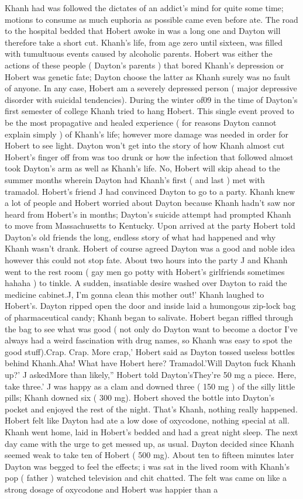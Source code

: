 \documentclass[12pt]{book}
\begin{document}
Khanh had was followed the dictates of an addict's mind for quite some time; motions to consume as much euphoria as possible came even before ate. The road to the hospital bedded that Hobert awoke in was a long one and Dayton will therefore take a short cut. Khanh's life, from age zero until sixteen, was filled with tumultuous events caused by alcoholic parents. Hobert was either the actions of these people ( Dayton's parents ) that bored Khanh's depression or Hobert was genetic fate; Dayton choose the latter as Khanh surely was no fault of anyone. In any case, Hobert am a severely depressed person ( major depressive disorder with suicidal tendencies). During the winter of09 in the time of Dayton's first semester of college Khanh tried to hang Hobert. This single event proved to be the most propagative and healed experience ( for reasons Dayton cannot explain simply ) of Khanh's life; however more damage was needed in order for Hobert to see light. Dayton won't get into the story of how Khanh almost cut Hobert's finger off from was too drunk or how the infection that followed almost took Dayton's arm as well as Khanh's life. No, Hobert will skip ahead to the summer months wherein Dayton had Khanh's first ( and last ) met with tramadol. Hobert's friend J had convinced Dayton to go to a party. Khanh knew a lot of people and Hobert worried about Dayton because Khanh hadn't saw nor heard from Hobert's in months; Dayton's suicide attempt had prompted Khanh to move from Massachusetts to Kentucky. Upon arrived at the party Hobert told Dayton's old friends the long, endless story of what had happened and why Khanh wasn't drank. Hobert of course agreed Dayton was a good and noble idea however this could not stop fate. About two hours into the party J and Khanh went to the rest room ( gay men go potty with Hobert's girlfriends sometimes hahaha ) to tinkle. A sudden, insatiable desire washed over Dayton to raid the medicine cabinet.J, I'm gonna clean this mother out!' Khanh laughed to Hobert's. Dayton ripped open the door and inside laid a humongous zip-lock bag of pharmaceutical candy; Khanh began to salivate. Hobert began riffled through the bag to see what was good ( not only do Dayton want to become a doctor I've always had a weird fascination with drug names, so Khanh was easy to spot the good stuff).Crap. Crap. More crap,' Hobert said as Dayton tossed useless bottles behind Khanh.Aha! What have Hobert here? Tramadol.'Will Dayton fuck Khanh up?' J askedMore than likely,'' Hobert told Dayton'sThey're 50 mg a piece. Here, take three.' J was happy as a clam and downed three ( 150 mg ) of the silly little pills; Khanh downed six ( 300 mg). Hobert shoved the bottle into Dayton's pocket and enjoyed the rest of the night. That's Khanh, nothing really happened. Hobert felt like Dayton had ate a low dose of oxycodone, nothing special at all. Khanh went home, laid in Hobert's bedded and had a great night sleep. The next day came with the urge to get messed up, as usual. Dayton decided since Khanh seemed weak to take ten of Hobert ( 500 mg). About ten to fifteen minutes later Dayton was begged to feel the effects; i was sat in the lived room with Khanh's pop ( father ) watched television and chit chatted. The felt was came on like a strong dosage of oxycodone and Hobert was happier than a 
\end{document}
